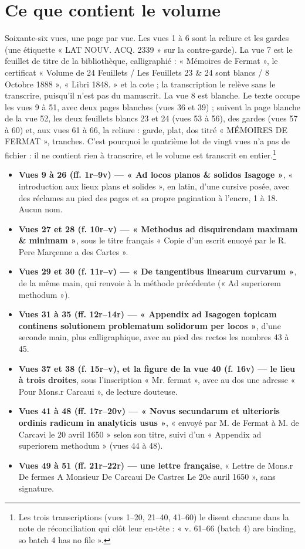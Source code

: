 \documentclass[11pt,a4paper]{article}
\begin{document}
\section*{Ce que contient le volume}

Soixante-six vues, une page par vue. Les vues 1 à 6 sont la reliure et les
gardes (une étiquette « LAT NOUV. ACQ. 2339 » sur la contre-garde). La vue 7 est
le feuillet de titre de la bibliothèque, calligraphié : « Mémoires de Fermat »,
le certificat « Volume de 24 Feuillets / Les Feuillets 23 \& 24 sont blancs /
8 Octobre 1888 », « Libri 1848. » et la cote ; la transcription le relève sans
le transcrire, puisqu'il n'est pas du manuscrit. La vue 8 est blanche. Le texte
occupe les vues 9 à 51, avec deux pages blanches (vues 36 et 39) ; suivent la
page blanche de la vue 52, les deux feuillets blancs 23 et 24 (vues 53 à 56),
des gardes (vues 57 à 60) et, aux vues 61 à 66, la reliure : garde, plat, dos
titré « MÉMOIRES DE FERMAT », tranches. C'est pourquoi le quatrième lot de vingt
vues n'a pas de fichier : il ne contient rien à transcrire, et le volume est
transcrit en entier.\footnote{Les trois transcriptions (vues 1–20, 21–40,
41–60) le disent chacune dans la note de réconciliation qui clôt leur en-tête :
« v. 61–66 (batch 4) are binding, so batch 4 has no file ».}

\begin{itemize}
  \item \textbf{Vues 9 à 26 (ff. 1r–9v) — « Ad locos planos \& solidos
    Isagoge »}, « introduction aux lieux plans et solides », en latin, d'une
    cursive posée, avec des réclames au pied des pages et sa propre pagination
    à l'encre, 1 à 18. Aucun nom.
  \item \textbf{Vues 27 et 28 (f. 10r–v) — « Methodus ad disquirendam maximam
    \& minimam »}, sous le titre français « Copie d'un escrit enuoyé par le R.
    Pere Marçenne a des Cartes ».
  \item \textbf{Vues 29 et 30 (f. 11r–v) — « De tangentibus linearum
    curvarum »}, de la même main, qui renvoie à la méthode précédente (« Ad
    superiorem methodum »).
  \item \textbf{Vues 31 à 35 (ff. 12r–14r) — « Appendix ad Isagogen topicam
    continens solutionem problematum solidorum per locos »}, d'une seconde
    main, plus calligraphique, avec au pied des rectos les nombres 43 à 45.
  \item \textbf{Vues 37 et 38 (f. 15r–v), et la figure de la vue 40 (f. 16v)
    — le lieu à trois droites}, sous l'inscription « Mr. fermat », avec au
    dos une adresse « Pour Mons.r Carcaui », de lecture douteuse.
  \item \textbf{Vues 41 à 48 (ff. 17r–20v) — « Novus secundarum et ulterioris
    ordinis radicum in analyticis usus »}, « envoyé par M. de Fermat à M. de
    Carcavi le 20 avril 1650 » selon son titre, suivi d'un « Appendix ad
    superiorem methodum » (vues 44 à 48).
  \item \textbf{Vues 49 à 51 (ff. 21r–22r) — une lettre française}, « Lettre
    de Mons.r De fermes A Monsieur De Carcaui De Castres Le 20e auril 1650 »,
    sans signature.
\end{itemize}
\end{document}
